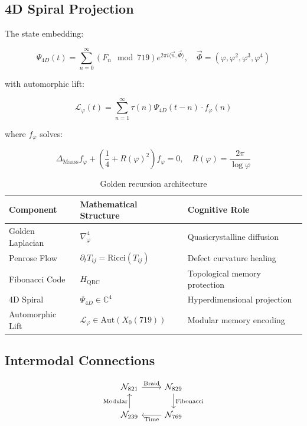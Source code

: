 \documentclass[12pt]{article}
\begin{document}
\subsection{4D Spiral Projection}

The state embedding:

\begin{equation}
\Psi_{4D}(t) = \sum_{n=0}^\infty (F_n \mod 719) e^{2\pi i \langle \vec{n}, \vec{\Phi} \rangle}, \quad \vec{\Phi} = (\varphi, \varphi^2, \varphi^3, \varphi^4)
\end{equation}

with automorphic lift:

\begin{equation}
\mathcal{L}_\varphi(t) = \sum_{n=1}^\infty \tau(n) \Psi_{4D}(t-n) \cdot f_\varphi(n)
\end{equation}

where $f_\varphi$ solves:

\begin{equation}
\Delta_{\text{Maass}} f_\varphi + \left(\frac{1}{4} + R(\varphi)^2\right)f_\varphi = 0, \quad R(\varphi) = \frac{2\pi}{\log \varphi}
\end{equation}

\begin{table}[h]
\centering
\begin{tabular}{lll}
\toprule
Component & Mathematical Structure & Cognitive Role \\
\midrule
Golden Laplacian & $\nabla^4_\varphi$ & Quasicrystalline diffusion \\
Penrose Flow & $\partial_t T_{ij} = \text{Ricci}(T_{ij})$ & Defect curvature healing \\
Fibonacci Code & $H_{\text{QRC}}$ & Topological memory protection \\
4D Spiral & $\Psi_{4D} \in \mathbb{C}^4$ & Hyperdimensional projection \\
Automorphic Lift & $\mathcal{L}_\varphi \in \text{Aut}(X_0(719))$ & Modular memory encoding \\
\bottomrule
\end{tabular}
\caption{Golden recursion architecture}
\end{table}

\subsection{Intermodal Connections}

\begin{equation}
\begin{tikzcd}
\mathcal{N}_{821} \arrow[r, "\text{Braid}"] & \mathcal{N}_{829} \arrow[d, "\text{Fibonacci}"] \\
\mathcal{N}_{239} \arrow[u, "\text{Modular}"] & \mathcal{N}_{769} \arrow[l, "\text{Time}"] 
\end{tikzcd}
\end{equation}
\end{document}
